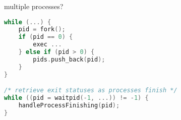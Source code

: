 

\begin{frame}[fragile,label=typicalPatternMultiple2]{multiple processes?}
\begin{lstlisting}[language=C++,style=small]
while (...) {
    pid = fork();
    if (pid == 0) {
        exec ...
    } else if (pid > 0) {
        pids.push_back(pid);
    }
}

/* retrieve exit statuses as processes finish */
while ((pid = waitpid(-1, ...)) != -1) {
    handleProcessFinishing(pid);
}
\end{lstlisting}
\end{frame}

